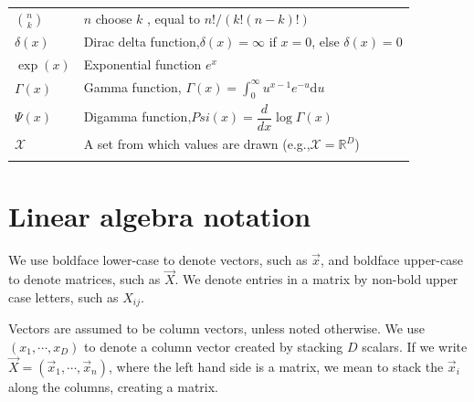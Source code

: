 \documentclass[a4paper,11pt]{article}
\begin{document}
\begin{longtable}{ll}
	$\binom{n}{k}$ & $n$ choose $k$ , equal to $n!/(k!(n−k )!)$\\
	$\delta(x)$ & Dirac delta function,$\delta(x)=\infty$ if $x=0$, else $\delta(x)=0$\\
	$\exp(x)$ & Exponential function $e^x$\\
	$\Gamma(x)$ & Gamma function, $\Gamma(x)=\int_0^\infty u^{x-1}e^{-u}\mathrm{d}u$\\
	$\Psi(x)$ &  Digamma function,$Psi(x)=\dfrac{d}{dx}\log\Gamma(x)$\\
	$\mathcal{X}$ & A set from which values are drawn (e.g.,$\mathcal{X}=\mathbb{R}^D$)\\
	\noalign{\smallskip}\hline\noalign{\smallskip}
\end{longtable}



\section*{Linear algebra notation}
We use boldface lower-case to denote vectors, such as $\vec{x}$, and boldface upper-case to denote matrices, such as $\vec{X}$. We denote entries in a matrix by non-bold upper case letters, such as $X_{ij}$.

Vectors are assumed to be column vectors, unless noted otherwise. We use $(x_1,\cdots,x_D)$ to denote a column vector created by stacking $D$ scalars. If we write $\vec{X}=(\vec{x}_1,\cdots,\vec{x}_n)$, where the left hand side is a matrix, we mean to stack the $\vec{x}_i$ along the columns, creating a matrix.
\end{document}

